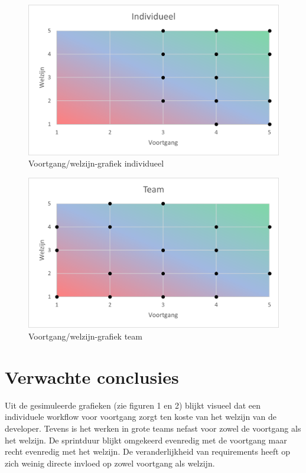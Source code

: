 \begin{figure}[!hb]
    \includegraphics[width=\columnwidth]{individueel.png}
    \caption{Voortgang/welzijn-grafiek individueel}
    \label{Voortgang/welzijn-grafiek voor een individuele workflow. Overlappende punten worden hier niet speciaal weergegeven.}
\end{figure}

\begin{figure}[!hb]
    \includegraphics[width=\columnwidth]{team.png}
    \caption{Voortgang/welzijn-grafiek team}
    \label{Voortgang/welzijn-grafiek voor een teamsgebonden workflow. Overlappende punten worden hier niet speciaal weergegeven.}
\end{figure}

\section{Verwachte conclusies}
\label{sec:verwachte_conclusies}
    Uit de gesimuleerde grafieken (zie figuren 1 en 2) blijkt visueel dat een individuele workflow voor voortgang zorgt ten koste van het welzijn van de developer. Tevens is het werken in grote teams nefast voor zowel de voortgang als het welzijn. De sprintduur blijkt omgekeerd evenredig met de voortgang maar recht evenredig met het welzijn. De veranderlijkheid van requirements heeft op zich weinig directe invloed op zowel voortgang als welzijn.
    
